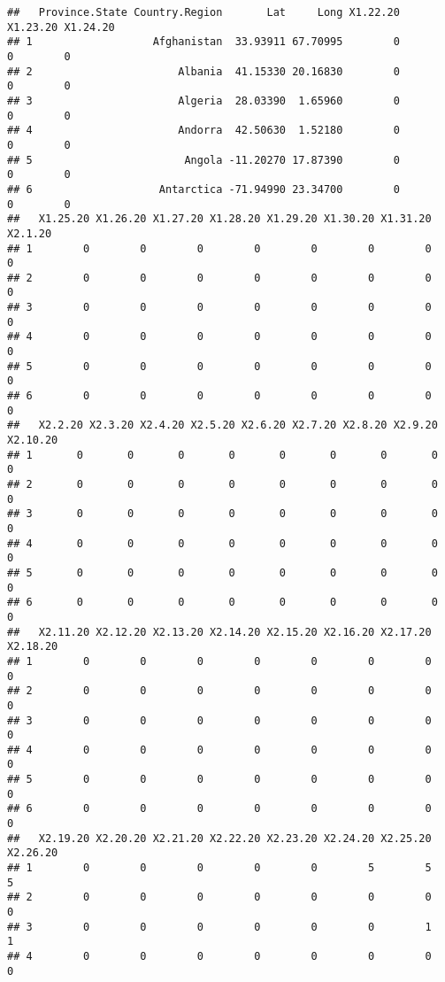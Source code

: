 \documentclass[
]{article}
\begin{document}
\begin{verbatim}
##   Province.State Country.Region       Lat     Long X1.22.20 X1.23.20 X1.24.20
## 1                   Afghanistan  33.93911 67.70995        0        0        0
## 2                       Albania  41.15330 20.16830        0        0        0
## 3                       Algeria  28.03390  1.65960        0        0        0
## 4                       Andorra  42.50630  1.52180        0        0        0
## 5                        Angola -11.20270 17.87390        0        0        0
## 6                    Antarctica -71.94990 23.34700        0        0        0
##   X1.25.20 X1.26.20 X1.27.20 X1.28.20 X1.29.20 X1.30.20 X1.31.20 X2.1.20
## 1        0        0        0        0        0        0        0       0
## 2        0        0        0        0        0        0        0       0
## 3        0        0        0        0        0        0        0       0
## 4        0        0        0        0        0        0        0       0
## 5        0        0        0        0        0        0        0       0
## 6        0        0        0        0        0        0        0       0
##   X2.2.20 X2.3.20 X2.4.20 X2.5.20 X2.6.20 X2.7.20 X2.8.20 X2.9.20 X2.10.20
## 1       0       0       0       0       0       0       0       0        0
## 2       0       0       0       0       0       0       0       0        0
## 3       0       0       0       0       0       0       0       0        0
## 4       0       0       0       0       0       0       0       0        0
## 5       0       0       0       0       0       0       0       0        0
## 6       0       0       0       0       0       0       0       0        0
##   X2.11.20 X2.12.20 X2.13.20 X2.14.20 X2.15.20 X2.16.20 X2.17.20 X2.18.20
## 1        0        0        0        0        0        0        0        0
## 2        0        0        0        0        0        0        0        0
## 3        0        0        0        0        0        0        0        0
## 4        0        0        0        0        0        0        0        0
## 5        0        0        0        0        0        0        0        0
## 6        0        0        0        0        0        0        0        0
##   X2.19.20 X2.20.20 X2.21.20 X2.22.20 X2.23.20 X2.24.20 X2.25.20 X2.26.20
## 1        0        0        0        0        0        5        5        5
## 2        0        0        0        0        0        0        0        0
## 3        0        0        0        0        0        0        1        1
## 4        0        0        0        0        0        0        0        0

\end{verbatim}
\end{document}
